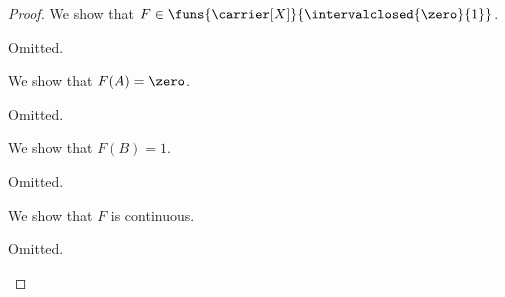 \begin{proof}
    
    We show that $F \in \funs{\carrier[X]}{\intervalclosed{\zero}{1}}$.
    \begin{subproof}        
        Omitted.
        
%
%   
%
%
%
%
    \end{subproof}

    We show that $F(A) = \zero$.
    \begin{subproof}
        Omitted.
    \end{subproof}

    We show that $F(B) = 1$.
    \begin{subproof}
        Omitted.
    \end{subproof}

    We show that $F$ is continuous.
    \begin{subproof}
        Omitted.
    \end{subproof}





\end{proof}

